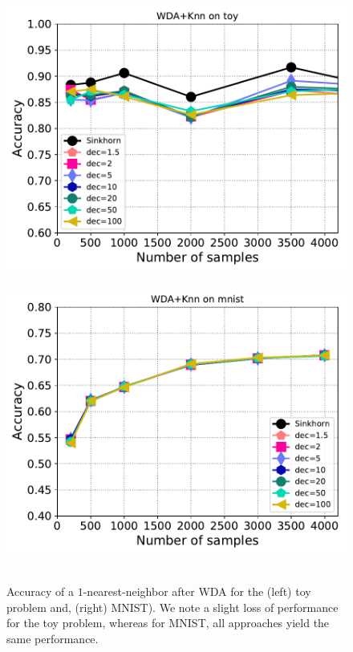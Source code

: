 \begin{figure}[htbp]
	\centering
	~\hfill~\includegraphics[width=6.cm]{./figs/wda_accur_toy.pdf}~\hfill~
	\includegraphics[width=6.cm]{./figs/wda_accur_mnist.pdf}~\hfill~\\
	\caption{Accuracy of a $1$-nearest-neighbor after WDA for the (left) toy problem and, (right) MNIST). We note a slight loss of performance for the toy problem, whereas for MNIST, all approaches yield the same performance. 
		\label{fig:wda_gain}}
\end{figure}

